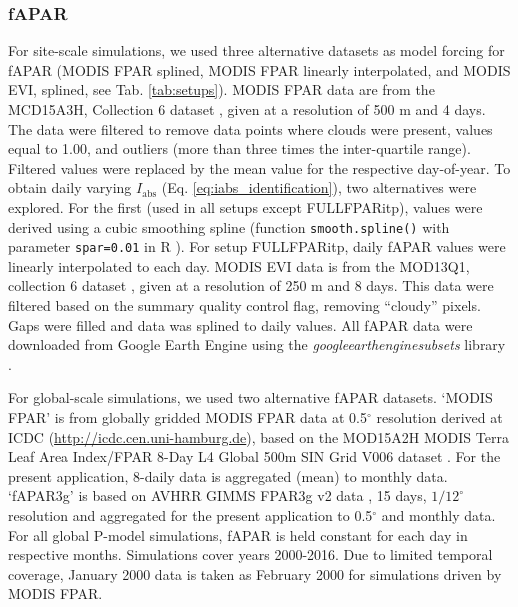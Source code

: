\documentclass[gmd, manuscript]{copernicus}
\begin{document}
\subsubsection{fAPAR}
\label{sec:greennessdata}

For site-scale simulations, we used three alternative datasets as model forcing for fAPAR (MODIS FPAR splined, MODIS FPAR linearly interpolated, and MODIS EVI, splined, see Tab. \ref{tab:setups}). MODIS FPAR data are from the MCD15A3H, Collection 6 dataset \citep{modis_fpar_6}, given at a resolution of 500 m and 4 days. The  data were filtered to remove data points where clouds were present, values equal to 1.00, and outliers (more than three times the inter-quartile range). Filtered values were replaced by the mean value for the respective day-of-year. To obtain daily varying $I_\text{abs}$ (Eq. \ref{eq:iabs_identification}), two alternatives were explored. For the first (used in all setups except FULL\textunderscore FPARitp), values were derived using a cubic smoothing spline (function \texttt{smooth.spline()} with parameter \texttt{spar=0.01} in R \citep{Rcoreteam}). For setup FULL\textunderscore FPARitp, daily fAPAR values were linearly interpolated to each day. MODIS EVI data is from the MOD13Q1, collection 6 dataset \citep{modis_evi_6}, given at a resolution of 250 m and 8 days. This data were filtered based on the summary quality control flag, removing ``cloudy'' pixels. Gaps were filled and data was splined to daily values. All fAPAR data were downloaded from Google Earth Engine using the \textit{google\textunderscore earth\textunderscore engine\textunderscore subsets} library \citep{gee_subset}. 

For global-scale simulations, we used two alternative fAPAR datasets. `MODIS FPAR' is from globally gridded MODIS FPAR data at 0.5$^{\circ}$ resolution derived at ICDC (\url{http://icdc.cen.uni-hamburg.de}), based on the MOD15A2H MODIS Terra Leaf Area Index/FPAR 8-Day L4 Global 500m SIN Grid V006 dataset \citep{modis_MOD15A2H}. For the present application, 8-daily data is aggregated (mean) to monthly data. `fAPAR3g' is based on AVHRR GIMMS FPAR3g v2 data \citep{zhu13rs}, 15 days, $1/12^{\circ}$ resolution and aggregated for the present application to 0.5$^{\circ}$ and monthly data. For all global P-model simulations, fAPAR is held constant for each day in respective months. Simulations cover years 2000-2016. Due to limited temporal coverage, January 2000 data is taken as February 2000 for simulations driven by MODIS FPAR.
\end{document}

